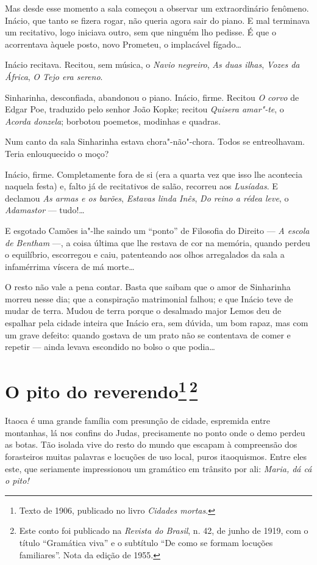 Mas desde esse momento a sala começou a observar um extraordinário
fenômeno. Inácio, que tanto se fizera rogar, não queria agora sair do
piano. E mal terminava um recitativo, logo iniciava outro, sem que
ninguém lho pedisse. É que o acorrentava àquele posto, novo Prometeu, o
implacável fígado\ldots{}

Inácio recitava. Recitou, sem música, o \emph{Navio negreiro}, \emph{As
duas ilhas}, \emph{Vozes da África}, \emph{O Tejo era sereno}.

Sinharinha, desconfiada, abandonou o piano. Inácio, firme. Recitou
\emph{O corvo} de Edgar Poe, traduzido pelo senhor João Kopke; recitou
\emph{Quisera amar"-te}, o \emph{Acorda donzela}; borbotou poemetos,
modinhas e quadras.

Num canto da sala Sinharinha estava chora"-não"-chora. Todos se
entreolhavam. Teria enlouquecido o moço?

Inácio, firme. Completamente fora de si (era a quarta vez que isso lhe
acontecia naquela festa) e, falto já de recitativos de salão, recorreu
aos \emph{Lusíadas}. E declamou \emph{As armas e os barões},
\emph{Estavas linda Inês}, \emph{Do reino a rédea leve}, o
\emph{Adamastor} --- tudo!\ldots{}

E esgotado Camões ia"-lhe saindo um ``ponto'' de Filosofia do Direito ---
\emph{A escola de Bentham} ---, a coisa última que lhe restava de cor na
memória, quando perdeu o equilíbrio, escorregou e caiu, patenteando aos
olhos arregalados da sala a infamérrima víscera de má morte\ldots{}

O resto não vale a pena contar. Basta que saibam que o amor de
Sinharinha morreu nesse dia; que a conspiração matrimonial falhou; e que
Inácio teve de mudar de terra. Mudou de terra porque o desalmado major
Lemos deu de espalhar pela cidade inteira que Inácio era, sem dúvida, um
bom rapaz, mas com um grave defeito: quando gostava de um prato não se
contentava de comer e repetir --- ainda levava escondido no bolso o que
podia\ldots{}

\chapter{O pito do reverendo\footnote[*]{Texto de 1906, publicado no livro \emph{Cidades mortas}.}\,\footnote[**]{Este conto foi publicado
  na \emph{Revista do Brasil}, n. 42, de junho de 1919, com o título
  ``Gramática viva'' e o subtítulo ``De como se formam locuções
  familiares''. Nota da edição de 1955.}}

Itaoca é uma grande família com presunção de cidade, espremida entre
montanhas, lá nos confins do Judas, precisamente no ponto onde o demo
perdeu as botas. Tão isolada vive do resto do mundo que escapam à
compreensão dos forasteiros muitas palavras e locuções de uso local,
puros itaoquismos. Entre eles este, que seriamente impressionou um
gramático em trânsito por ali: \emph{Maria, dá cá o pito!}

